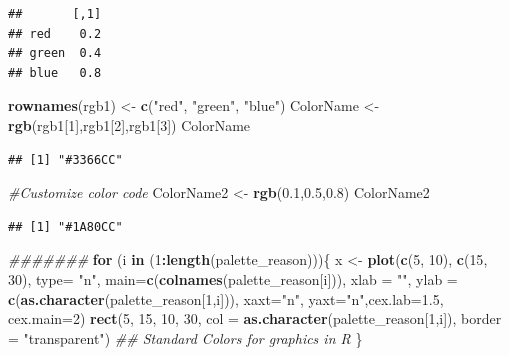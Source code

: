 \documentclass[
]{article}
\newenvironment{Shaded}{\begin{snugshade}}{\end{snugshade}}
\newcommand{\CommentTok}[1]{\textcolor[rgb]{0.56,0.35,0.01}{\textit{#1}}}
\newcommand{\ControlFlowTok}[1]{\textcolor[rgb]{0.13,0.29,0.53}{\textbf{#1}}}
\newcommand{\DataTypeTok}[1]{\textcolor[rgb]{0.13,0.29,0.53}{#1}}
\newcommand{\DecValTok}[1]{\textcolor[rgb]{0.00,0.00,0.81}{#1}}
\newcommand{\FloatTok}[1]{\textcolor[rgb]{0.00,0.00,0.81}{#1}}
\newcommand{\KeywordTok}[1]{\textcolor[rgb]{0.13,0.29,0.53}{\textbf{#1}}}
\newcommand{\NormalTok}[1]{#1}
\newcommand{\OperatorTok}[1]{\textcolor[rgb]{0.81,0.36,0.00}{\textbf{#1}}}
\newcommand{\StringTok}[1]{\textcolor[rgb]{0.31,0.60,0.02}{#1}}
\begin{document}
\begin{verbatim}
##       [,1]
## red    0.2
## green  0.4
## blue   0.8
\end{verbatim}

\begin{Shaded}
\begin{Highlighting}[]
\KeywordTok{rownames}\NormalTok{(rgb1) <-}\StringTok{ }\KeywordTok{c}\NormalTok{(}\StringTok{"red"}\NormalTok{, }\StringTok{"green"}\NormalTok{, }\StringTok{"blue"}\NormalTok{)}
\NormalTok{ColorName <-}\StringTok{ }\KeywordTok{rgb}\NormalTok{(rgb1[}\DecValTok{1}\NormalTok{],rgb1[}\DecValTok{2}\NormalTok{],rgb1[}\DecValTok{3}\NormalTok{])}
\NormalTok{ColorName}
\end{Highlighting}
\end{Shaded}

\begin{verbatim}
## [1] "#3366CC"
\end{verbatim}

\begin{Shaded}
\begin{Highlighting}[]
\CommentTok{#Customize color code}
\NormalTok{ColorName2 <-}\StringTok{ }\KeywordTok{rgb}\NormalTok{(}\FloatTok{0.1}\NormalTok{,}\FloatTok{0.5}\NormalTok{,}\FloatTok{0.8}\NormalTok{)}
\NormalTok{ColorName2}
\end{Highlighting}
\end{Shaded}

\begin{verbatim}
## [1] "#1A80CC"
\end{verbatim}

\begin{Shaded}
\begin{Highlighting}[]
\CommentTok{#######}
\ControlFlowTok{for}\NormalTok{ (i }\ControlFlowTok{in}\NormalTok{ (}\DecValTok{1}\OperatorTok{:}\KeywordTok{length}\NormalTok{(palette_reason)))\{}
\NormalTok{x <-}\StringTok{ }\KeywordTok{plot}\NormalTok{(}\KeywordTok{c}\NormalTok{(}\DecValTok{5}\NormalTok{, }\DecValTok{10}\NormalTok{), }\KeywordTok{c}\NormalTok{(}\DecValTok{15}\NormalTok{, }\DecValTok{30}\NormalTok{), }\DataTypeTok{type=} \StringTok{"n"}\NormalTok{, }\DataTypeTok{main=}\KeywordTok{c}\NormalTok{(}\KeywordTok{colnames}\NormalTok{(palette_reason[i])), }\DataTypeTok{xlab =} \StringTok{""}\NormalTok{, }
\DataTypeTok{ylab =} \KeywordTok{c}\NormalTok{(}\KeywordTok{as.character}\NormalTok{(palette_reason[}\DecValTok{1}\NormalTok{,i])), }\DataTypeTok{xaxt=}\StringTok{"n"}\NormalTok{, }\DataTypeTok{yaxt=}\StringTok{"n"}\NormalTok{,}\DataTypeTok{cex.lab=}\FloatTok{1.5}\NormalTok{, }\DataTypeTok{cex.main=}\DecValTok{2}\NormalTok{)}
\KeywordTok{rect}\NormalTok{(}\DecValTok{5}\NormalTok{, }\DecValTok{15}\NormalTok{, }\DecValTok{10}\NormalTok{, }\DecValTok{30}\NormalTok{, }\DataTypeTok{col =} \KeywordTok{as.character}\NormalTok{(palette_reason[}\DecValTok{1}\NormalTok{,i]), }\DataTypeTok{border =} \StringTok{"transparent"}\NormalTok{)}
\CommentTok{## Standard Colors for graphics in R}
\NormalTok{\}}
\end{Highlighting}
\end{Shaded}
\end{document}
